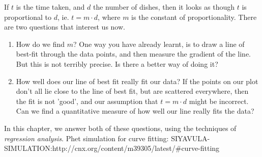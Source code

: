 If $t$ is the time taken, and $d$ the number of dishes, then it looks as though $t$ is proportional to $d$, ie. $t=m\cdot d$, where $m$ is the constant of proportionality. There are two questions that interest us now.
\begin{enumerate}
\item How do we find $m$? One way you have already learnt, is to draw a line of best-fit through the data points, and then measure the gradient of the line. But this is not terribly precise. Is there a better way of doing it?
\item How well does our line of best fit really fit our data?  If the points on our plot don't all lie close to the line of best fit, but are scattered everywhere, then the fit is not 'good', and our assumption that $t=m\cdot d$ might be incorrect. Can we find a quantitative measure of how well our line really fits the data?
\end{enumerate}
In this chapter, we answer both of these questions, using the techniques of \emph{regression analysis}.
Phet simulation for curve fitting: SIYAVULA-SIMULATION:http://cnx.org/content/m39305/latest/#curve-fitting
